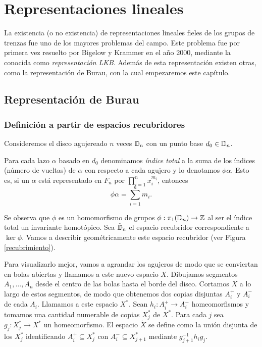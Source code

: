 \documentclass[TFG.tex]{subfiles}
\begin{document}
\chapter{Representaciones lineales}

La existencia (o no existencia) de representaciones lineales fieles de los grupos de trenzas fue uno de los mayores problemas del campo. Este problema fue por primera vez resuelto por Bigelow \cite{Bigelow} y Krammer \cite{Krammer} en el año 2000, mediante la conocida como \emph{representación LKB}. Además de esta representación existen otras, como la representación de Burau, con la cual empezaremos este capítulo.

\section{Representación de Burau}

\subsection{Definición a partir de espacios recubridores}

Consideremos el disco agujereado $n$ veces $\mathbb{D}_n$ con un punto base $d_0\in\mathbb{D}_n$. 
\begin{defi}
Para cada lazo $\alpha$ basado en $d_0$ denominamos \emph{índice total}  a la suma de los índices (número de vueltas) de $\alpha$ con respecto a cada agujero y lo denotamos $\phi\alpha$. Esto es, si un $\alpha$ está representado en $F_n$ por $\prod_{i=1}^n x_i^{m_i}$, entonces 
\[
\phi\alpha=\sum_{i=1}^nm_i.
\]
\end{defi}

Se observa que $\phi$ es un homomorfismo de grupos $\phi:\pi_1(\mathbb{D}_n)\to\mathbb{Z}$ al ser el índice total un invariante homotópico. Sea $\tilde{\mathbb{D}}_n$ el espacio recubridor correspondiente a $\ker\phi$. Vamos a describir geométricamente este espacio recubridor (ver Figura \ref{recubrimiento}). 


Para visualizarlo mejor, vamos a agrandar los agujeros de modo que se conviertan en bolas abiertas y llamamos a este nuevo espacio $X$. Dibujamos segmentos $A_1,\dots, A_n$ desde el centro de las bolas hasta el borde del disco. Cortamos $X$ a lo largo de estos segmentos, de modo que obtenemos dos copias disjuntas $A_i^+$ y $A_i^-$ de cada $A_i$. Llamamos a este espacio $X^*$. Sean $h_i:A_i^+\to A_i^-$ homeomorfismos y tomamos una cantidad numerable de copias $X^*_j$ de $X^*$. Para cada $j$ sea $g_j:X^*_j\to X^*$ un homeomorfismo. El espacio $\tilde{X}$ se define como la unión disjunta de los $X^*_j$ identificando $A_i^+\subseteq X^*_j$ con $A_i^-\subseteq X^*_{j+1}$ mediante $g_{j+1}^{-1}h_ig_j$.
\end{document}
